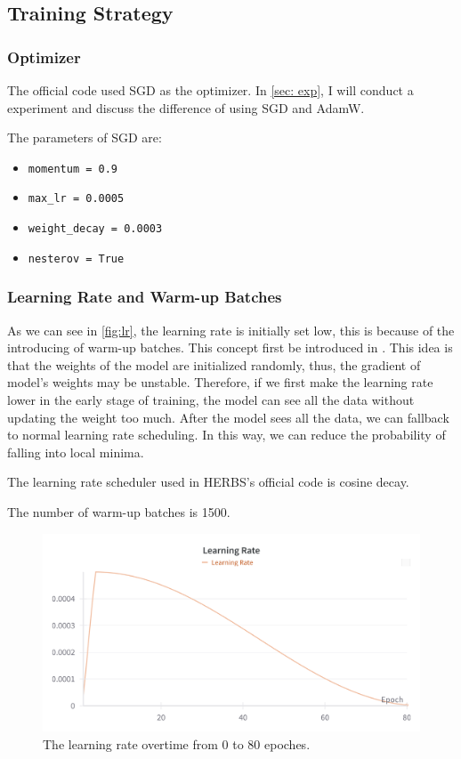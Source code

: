 \documentclass[twocolumn]{extarticle}
\begin{document}
\subsection{Training Strategy}



\subsubsection{Optimizer}

The official code used SGD as the optimizer. In \autoref{sec: exp}, I will conduct a experiment and discuss the difference of using SGD and AdamW.

The parameters of SGD are:

\begin{itemize}
\item \texttt{momentum = 0.9}
\item \texttt{max\_lr = 0.0005}
\item \texttt{weight\_decay = 0.0003}
\item \texttt{nesterov = True}
\end{itemize}

\subsubsection{Learning Rate and Warm-up Batches}

As we can see in \autoref{fig:lr}, the learning rate is initially set low, this is because of the introducing of warm-up batches. This concept first be introduced in \cite{goyal2017accurate}. This idea is that the weights of the model are initialized randomly, thus, the gradient of model's weights may be unstable. Therefore, if we first make the learning rate lower in the early stage of training, the model can see all the data without updating the weight too much. After the model sees all the data, we can fallback to normal learning rate scheduling. In this way, we can reduce the probability of falling into local minima.

The learning rate scheduler used in HERBS's official code is cosine decay. 

The number of warm-up batches is 1500.

\begin{figure}[H]
\centering
\includegraphics[width=0.95\linewidth]{figure/lr}
\caption{The learning rate overtime from 0 to 80 epoches.}
\label{fig:lr}
\end{figure}
\end{document}
